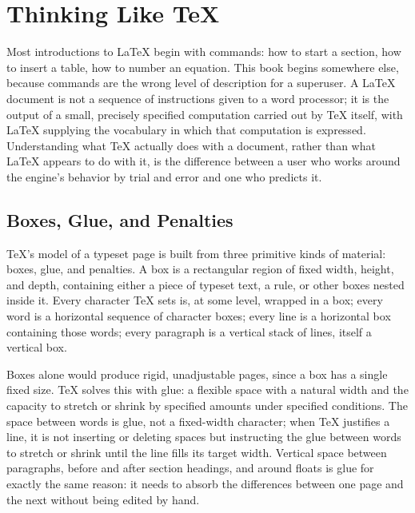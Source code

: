 \hypertarget{chapter-1-thinking-like-tex}{%
\chapter{Thinking Like TeX}\label{chapter-1-thinking-like-tex}}

Most introductions to LaTeX begin with commands: how to start a section, how to insert a table, how to number an equation. This book begins somewhere else, because commands are the wrong level of description for a superuser. A LaTeX document is not a sequence of instructions given to a word processor; it is the output of a small, precisely specified computation carried out by TeX itself, with LaTeX supplying the vocabulary in which that computation is expressed. Understanding what TeX actually does with a document, rather than what LaTeX appears to do with it, is the difference between a user who works around the engine's behavior by trial and error and one who predicts it.

\hypertarget{boxes-glue-and-penalties}{%
\section{Boxes, Glue, and Penalties}\label{boxes-glue-and-penalties}}

TeX's model of a typeset page is built from three primitive kinds of material: boxes, glue, and penalties. A box is a rectangular region of fixed width, height, and depth, containing either a piece of typeset text, a rule, or other boxes nested inside it. Every character TeX sets is, at some level, wrapped in a box; every word is a horizontal sequence of character boxes; every line is a horizontal box containing those words; every paragraph is a vertical stack of lines, itself a vertical box.

Boxes alone would produce rigid, unadjustable pages, since a box has a single fixed size. TeX solves this with glue: a flexible space with a natural width and the capacity to stretch or shrink by specified amounts under specified conditions. The space between words is glue, not a fixed-width character; when TeX justifies a line, it is not inserting or deleting spaces but instructing the glue between words to stretch or shrink until the line fills its target width. Vertical space between paragraphs, before and after section headings, and around floats is glue for exactly the same reason: it needs to absorb the differences between one page and the next without being edited by hand.

